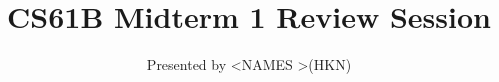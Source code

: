   


\title{CS61B Midterm 1 Review Session}
\author{Presented by \textless NAMES \textgreater (HKN)}
\date{}

\newcommand{\SlideAccessingLogistics}{@\#}










